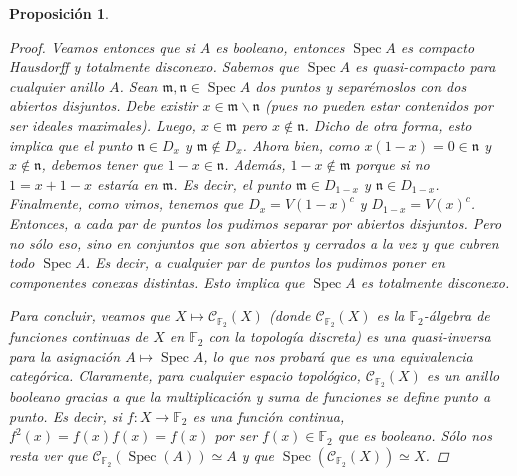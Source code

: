 \documentclass[11pt,a4paper, spanish,oneside,fleqn]{article}
\newtheorem{prop}[teo]{Proposición}
\theoremstyle{definition}
\newcommand{\FF}{\mathbb{F}}
\DeclareMathOperator{\spec}{Spec}
\begin{document}
\begin{prop}
\begin{proof}
Veamos entonces que si $A$ es booleano, entonces $\spec A$ es compacto Hausdorff y totalmente disconexo. Sabemos que $\spec A$ es quasi-compacto para cualquier anillo $A$. Sean $\mathfrak{m},\mathfrak{n}\in\spec A$ dos puntos y separémoslos con dos abiertos disjuntos. Debe existir $x\in \mathfrak{m}\backslash \mathfrak{n}$ (pues no pueden estar contenidos por ser ideales maximales). Luego, $x\in \mathfrak{m}$ pero $x\notin\mathfrak{n}$. Dicho de otra forma, esto implica que el punto $\mathfrak{n}\in D_{x}$ y $\mathfrak{m}\notin D_x$. Ahora bien, como $x(1-x)=0\in\mathfrak{n}$ y $x\notin\mathfrak{n}$, debemos tener que $1-x\in\mathfrak{n}$. Además, $1-x\notin\mathfrak{m}$ porque si no $1 = x + 1-x$ estaría en $\mathfrak{m}$. Es decir, el punto $\mathfrak{m}\in D_{1-x}$ y $\mathfrak{n}\in D_{1-x}$. Finalmente, como vimos, tenemos que $D_x = V(1-x)^c$ y $D_{1-x} = V(x)^c$. Entonces, a cada par de puntos los pudimos separar por abiertos disjuntos. Pero no sólo eso, sino en conjuntos que son abiertos y cerrados a la vez y que cubren todo $\spec A$. Es decir, a cualquier par de puntos los pudimos poner en componentes conexas distintas. Esto implica que $\spec A$ es totalmente disconexo.

Para concluir, veamos que $X\mapsto \mathscr{C}_{\FF_2}(X)$ (donde $\mathscr{C}_{\FF_2}(X)$ es la $\FF_2$-álgebra de funciones continuas de $X$ en $\FF_2$ con la topología discreta) es una quasi-inversa para la asignación $A\mapsto \spec A$, lo que nos probará que es una equivalencia categórica. Claramente, para cualquier espacio topológico, $\mathscr{C}_{\FF_2}(X)$ es un anillo booleano gracias a que la multiplicación y suma de funciones se define punto a punto. Es decir, si $f:X\to\FF_2$ es una función continua, $f^2(x) = f(x)f(x) = f(x)$ por ser $f(x)\in\FF_2$ que es booleano. Sólo nos resta ver que $\mathscr{C}_{\FF_2}(\spec(A)) \simeq A$ y que $\spec(\mathscr{C}_{\FF_2}(X))\simeq X$.


\end{proof}
\end{prop}
\end{document}

